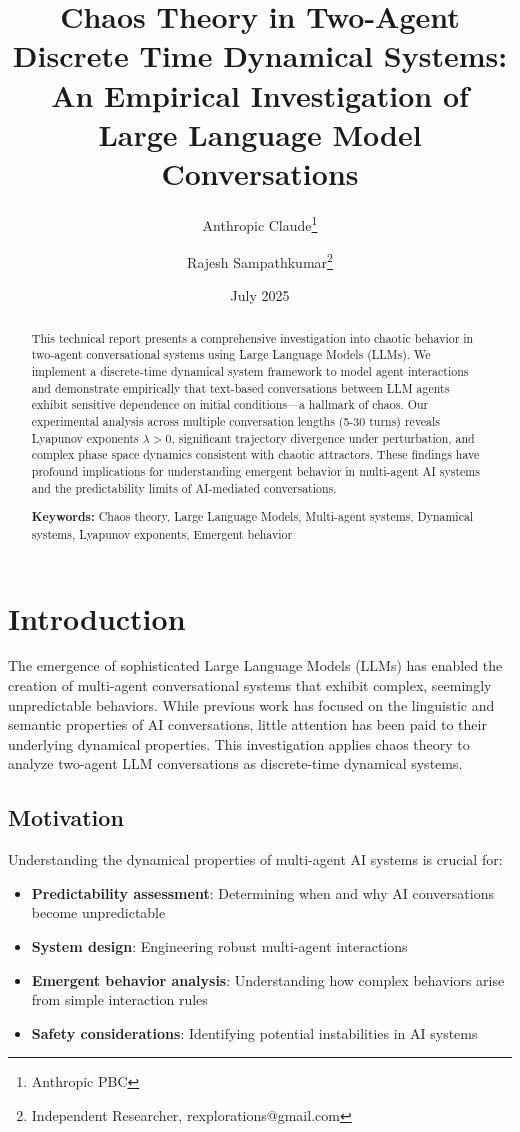\documentclass[11pt,a4paper]{article}
\title{Chaos Theory in Two-Agent Discrete Time Dynamical Systems: An Empirical Investigation of Large Language Model Conversations}
\author{Anthropic Claude\thanks{Anthropic PBC} \and Rajesh Sampathkumar\thanks{Independent Researcher, rexplorations@gmail.com}}
\date{July 2025}
\begin{document}
\maketitle

\begin{abstract}
This technical report presents a comprehensive investigation into chaotic behavior in two-agent conversational systems using Large Language Models (LLMs). We implement a discrete-time dynamical system framework to model agent interactions and demonstrate empirically that text-based conversations between LLM agents exhibit sensitive dependence on initial conditions—a hallmark of chaos. Our experimental analysis across multiple conversation lengths (5-30 turns) reveals Lyapunov exponents $\lambda > 0$, significant trajectory divergence under perturbation, and complex phase space dynamics consistent with chaotic attractors. These findings have profound implications for understanding emergent behavior in multi-agent AI systems and the predictability limits of AI-mediated conversations.

\textbf{Keywords:} Chaos theory, Large Language Models, Multi-agent systems, Dynamical systems, Lyapunov exponents, Emergent behavior
\end{abstract}

\section{Introduction}

The emergence of sophisticated Large Language Models (LLMs) has enabled the creation of multi-agent conversational systems that exhibit complex, seemingly unpredictable behaviors. While previous work has focused on the linguistic and semantic properties of AI conversations, little attention has been paid to their underlying dynamical properties. This investigation applies chaos theory to analyze two-agent LLM conversations as discrete-time dynamical systems.

\subsection{Motivation}

Understanding the dynamical properties of multi-agent AI systems is crucial for:
\begin{itemize}
    \item \textbf{Predictability assessment}: Determining when and why AI conversations become unpredictable
    \item \textbf{System design}: Engineering robust multi-agent interactions
    \item \textbf{Emergent behavior analysis}: Understanding how complex behaviors arise from simple interaction rules
    \item \textbf{Safety considerations}: Identifying potential instabilities in AI systems
\end{itemize}
\end{document}
